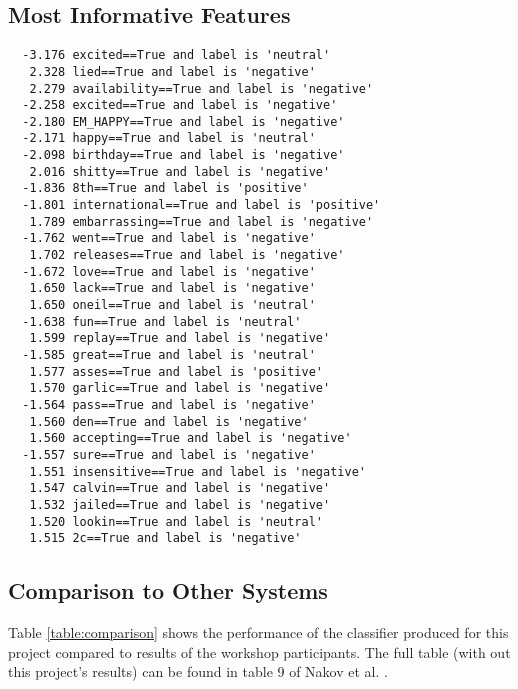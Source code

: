 \documentclass[final,3p,12pt]{elsarticle}
\begin{document}
\subsection{Most Informative Features}


\begin{verbatim}
  -3.176 excited==True and label is 'neutral'
   2.328 lied==True and label is 'negative'
   2.279 availability==True and label is 'negative'
  -2.258 excited==True and label is 'negative'
  -2.180 EM_HAPPY==True and label is 'negative'
  -2.171 happy==True and label is 'neutral'
  -2.098 birthday==True and label is 'negative'
   2.016 shitty==True and label is 'negative'
  -1.836 8th==True and label is 'positive'
  -1.801 international==True and label is 'positive'
   1.789 embarrassing==True and label is 'negative'
  -1.762 went==True and label is 'negative'
   1.702 releases==True and label is 'negative'
  -1.672 love==True and label is 'negative'
   1.650 lack==True and label is 'negative'
   1.650 oneil==True and label is 'neutral'
  -1.638 fun==True and label is 'neutral'
   1.599 replay==True and label is 'negative'
  -1.585 great==True and label is 'neutral'
   1.577 asses==True and label is 'positive'
   1.570 garlic==True and label is 'negative'
  -1.564 pass==True and label is 'negative'
   1.560 den==True and label is 'negative'
   1.560 accepting==True and label is 'negative'
  -1.557 sure==True and label is 'negative'
   1.551 insensitive==True and label is 'negative'
   1.547 calvin==True and label is 'negative'
   1.532 jailed==True and label is 'negative'
   1.520 lookin==True and label is 'neutral'
   1.515 2c==True and label is 'negative'
\end{verbatim}

\subsection{Comparison to Other Systems}

Table \ref{table:comparison} shows the performance of the classifier produced
for this project compared to results of the workshop participants. The full
table (with out this project's results) can be found in table 9 of Nakov et al.
\cite{Nakov2013}.
\end{document}
